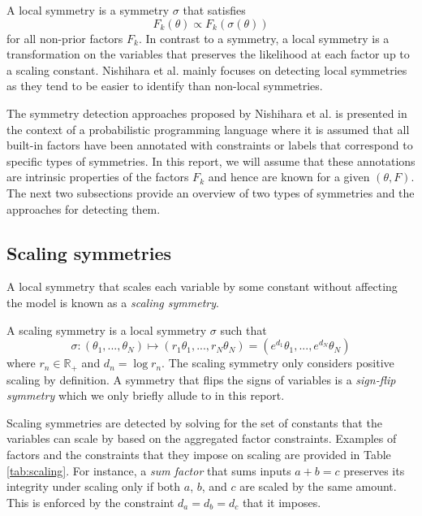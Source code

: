 \begin{defn}
A local symmetry is a symmetry $\sigma$ that satisfies
\[
F_k(\theta) \propto F_k\left(\sigma(\theta)\right)
\]
for all non-prior factors $F_k$. In contrast to a symmetry, a local symmetry is a transformation on the variables that preserves the likelihood at each factor up to a scaling constant. Nishihara et al. \cite{Nishihara:2013} mainly focuses on detecting local symmetries as they tend to be easier to identify than non-local symmetries.
\end{defn}

The symmetry detection approaches proposed by Nishihara et al. is presented in the context of a probabilistic programming language where it is assumed that all built-in factors have been annotated with constraints or labels that correspond to specific types of symmetries. In this report, we will assume that these annotations are intrinsic properties of the factors $F_k$ and hence are known for a given $(\theta,F)$. The next two subsections provide an overview of two types of symmetries and the approaches for detecting them.


\subsection{Scaling symmetries} \label{sec:scaling}

A local symmetry that scales each variable by some constant without affecting the model is known as a \textit{scaling symmetry}.

\begin{defn}
A scaling symmetry is a local symmetry $\sigma$ such that
\[
\sigma: (\theta_1,...,\theta_N) \longmapsto (r_1\theta_1,...,r_N\theta_N) = (e^{d_1}\theta_1,...,e^{d_N}\theta_N)
\]
where $r_n\in\mathbb{R}_+$ and $d_n=\log r_n$. The scaling symmetry only considers positive scaling by definition. A symmetry that flips the signs of variables is a \textit{sign-flip symmetry} which we only briefly allude to in this report.
\end{defn}

Scaling symmetries are detected by solving for the set of constants that the variables can scale by based on the aggregated factor constraints. Examples of factors and the constraints that they impose on scaling are provided in Table \ref{tab:scaling}. For instance, a \textit{sum factor} that sums inputs $a+b=c$ preserves its integrity under scaling only if both $a$, $b$, and $c$ are scaled by the same amount. This is enforced by the constraint $d_a=d_b=d_c$ that it imposes.

